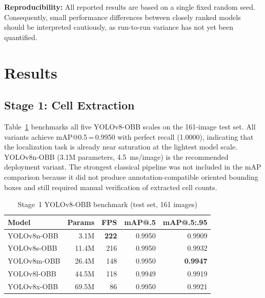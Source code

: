 \documentclass[conference]{IEEEtran}
\begin{document}
\textbf{Reproducibility:} All reported results are based on a single fixed random seed. Consequently, small performance differences between closely ranked models should be interpreted cautiously, as run-to-run variance has not yet been quantified.

\section{Results}
\label{sec:results}

\subsection{Stage 1: Cell Extraction}

Table~\ref{tab:stage1_results} benchmarks all five YOLOv8-OBB scales on the 161-image test set. All variants achieve mAP@0.5\,=\,0.9950 with perfect recall (1.0000), indicating that the localization task is already near saturation at the lightest model scale. YOLOv8n-OBB (3.1M parameters, 4.5~ms/image) is the recommended deployment variant. The strongest classical pipeline was not included in the mAP comparison because it did not produce annotation-compatible oriented bounding boxes and still required manual verification of extracted cell counts.

\begin{table}[t]
  \caption{Stage~1 YOLOv8-OBB benchmark (test set, 161 images)}
  \label{tab:stage1_results}
  \begin{center}
  \renewcommand{\arraystretch}{1.05}\small
  \begin{tabular}{lrrrr}
    \toprule
    \textbf{Model} & \textbf{Params} & \textbf{FPS} & \textbf{mAP@.5} & \textbf{mAP@.5:.95}\\
    \midrule
    YOLOv8n-OBB & 3.1M  & \textbf{222} & 0.9950 & 0.9909\\
    YOLOv8s-OBB & 11.4M & 216          & 0.9950 & 0.9932\\
    YOLOv8m-OBB & 26.4M & 148          & 0.9950 & \textbf{0.9947}\\
    YOLOv8l-OBB & 44.5M & 118          & 0.9949 & 0.9919\\
    YOLOv8x-OBB & 69.5M & 86           & 0.9950 & 0.9921\\
    \midrule
  \end{tabular}
  \end{center}
\end{table}
\end{document}
